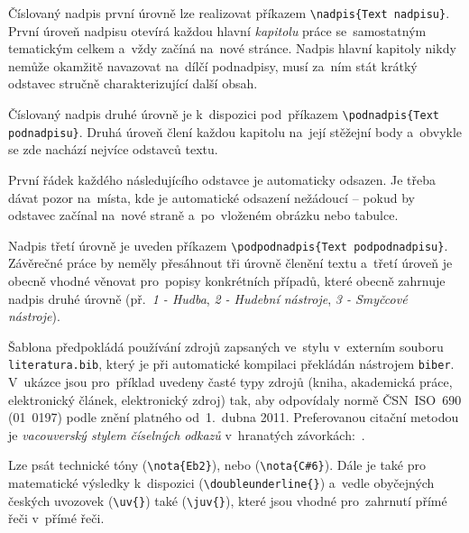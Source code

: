 Číslovaný nadpis první úrovně lze realizovat příkazem
\texttt{{\textbackslash}nadpis\{Text nadpisu\}}. První úroveň nadpisu otevírá
každou hlavní \emph{kapitolu} práce se~samostatným tematickým celkem a~vždy
začíná na~nové stránce. Nadpis hlavní kapitoly nikdy nemůže okamžitě navazovat
na~dílčí podnadpisy, musí za~ním stát krátký odstavec stručně charakterizující
další obsah.

Číslovaný nadpis druhé úrovně je k~dispozici pod~příkazem
\texttt{{\textbackslash}podnadpis\{Text podnadpisu\}}. Druhá úroveň člení každou
kapitolu na~její stěžejní body a~obvykle se zde nachází nejvíce odstavců textu.

První řádek každého následujícího odstavce je automaticky odsazen. Je třeba
dávat pozor na~místa, kde je automatické odsazení nežádoucí -- pokud
by odstavec začínal na~nové straně a~po~vloženém obrázku nebo tabulce.

Nadpis třetí úrovně je uveden příkazem
\texttt{{\textbackslash}podpodnadpis\{Text podpodnadpisu\}}. Závěrečné práce by
neměly přesáhnout tři úrovně členění textu a~třetí úroveň je obecně vhodné
věnovat pro~popisy konkrétních případů, které obecně zahrnuje nadpis druhé
úrovně (př.~\textit{1 - Hudba}, \textit{2 - Hudební nástroje}, \textit{3 -
Smyčcové nástroje}).


Šablona předpokládá používání zdrojů zapsaných ve~stylu 
v~externím souboru \texttt{literatura.bib}, který je při automatické kompilaci
překládán nástrojem \texttt{biber}. V~ukázce jsou pro~příklad uvedeny časté typy
zdrojů (kniha, akademická práce, elektronický článek, elektronický zdroj) tak,
aby odpovídaly normě ČSN~ISO~690 (01~0197) podle znění platného od~1.~dubna
2011. Preferovanou citační metodou je \emph{vacouverský stylem číselných odkazů}
v~hranatých závorkách:~\cite[19]{hladena19}.

\nocite{*}

Lze psát technické tóny  (\texttt{{\textbackslash}nota\{Eb2\}}),
nebo  (\texttt{{\textbackslash}nota\{C\#6\}}). Dále je také
pro matematické výsledky k~dispozici 
(\texttt{{\textbackslash}doubleunderline\{\}}) a~vedle obyčejných českých
uvozovek (\texttt{{\textbackslash}uv\{\}}) také 
(\texttt{{\textbackslash}juv\{\}}), které jsou vhodné pro~zahrnutí přímé řeči
v~přímé řeči.

